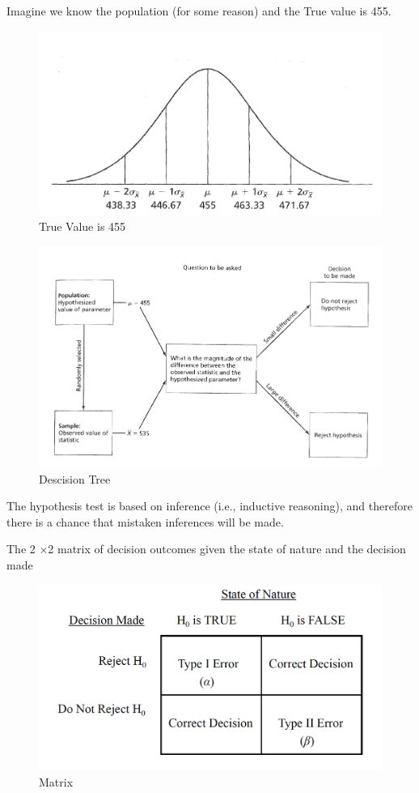 \documentclass[]{book}
\theoremstyle{definition}
\theoremstyle{definition}
\theoremstyle{definition}
\theoremstyle{remark}
\begin{document}
Imagine we know the population (for some reason) and the True value is
455.

\begin{figure}
\centering
\includegraphics{img/hicksonesample1.png}
\caption{True Value is 455}
\end{figure}

\begin{figure}
\centering
\includegraphics{img/hicksonesample2.png}
\caption{Descision Tree}
\end{figure}

The hypothesis test is based on inference (i.e., inductive reasoning),
and therefore there is a chance that mistaken inferences will be made.

The 2 ×2 matrix of decision outcomes given the state of nature and the
decision made

\begin{figure}
\centering
\includegraphics{img/hicksonesample3.png}
\caption{Matrix}
\end{figure}
\end{document}

